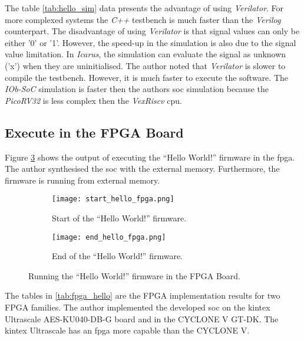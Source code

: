 The table \ref{tab:hello_sim} data presents the advantage of using \textit{Verilator}. For more complexed systems the \textit{C++} testbench is much faster than the \textit{Verilog} counterpart. The disadvantage of using \textit{Verilator} is that signal values can only be either '0' or '1'. However, the speed-up in the simulation is also due to the signal value limitation. In \textit{Icarus}, the simulation can evaluate the signal as unknown ('x') when they are uninitialised. The author noted that \textit{Verilator} is slower to compile the testbench. However, it is much faster to execute the software. The \textit{IOb-SoC} simulation is faster then the authors \acrshort{soc} simulation because the \textit{PicoRV32} is less complex then the \textit{VexRiscv} \acrshort{cpu}.

\subsection{Execute in the FPGA Board}
Figure \ref{fig:hello_fpga} shows the output of executing the \enquote{Hello World!} firmware in the \acrshort{fpga}. The author synthesised the \acrshort{soc} with the external memory. Furthermore, the firmware is running from external memory.

\begin{figure}[!ht]
    \centering
    \begin{subfigure}[b]{0.49\textwidth}
        \centering
        \texttt{[image: start\_hello\_fpga.png]}
        \caption{Start of the \enquote{Hello World!} firmware.}
        \label{fig:start_hello_fpga}
    \end{subfigure}
    \hfill
    \begin{subfigure}[b]{0.49\textwidth}
        \centering
        \texttt{[image: end\_hello\_fpga.png]}
        \caption{End of the \enquote{Hello World!} firmware.}
        \label{fig:end_hello_fpga}
    \end{subfigure}
    \caption{Running the \enquote{Hello World!} firmware in the FPGA Board.}
    \label{fig:hello_fpga}
\end{figure}

The tables in \ref{tab:fpga_hello} are the FPGA implementation results for two FPGA families. The author implemented the developed \acrshort{soc} on the kintex Ultrascale AES-KU040-DB-G board and in the CYCLONE V GT-DK. The kintex Ultrascale has an \acrshort{fpga} more capable than the CYCLONE V.

